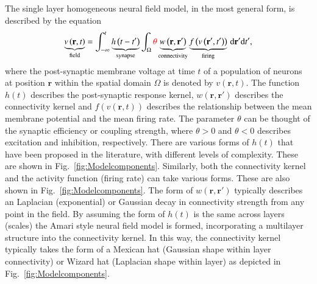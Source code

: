\documentclass[review,authoryear,3p]{elsarticle}
\newcommand{\parham}[1]{\textcolor{red}{#1}}
\begin{document}
\doublespacing

The single layer homogeneous neural field model, in the most general form, is described by the equation
\begin{equation}
	\label{FullDoubleIntModel} \underbrace{v\left(\mathbf{r},t\right)}_{\text{field}} =
	\int_{-\infty}^t 
	\underbrace{h\left(t - t'\right)}_{\text{synapse}} \int_\Omega
	\parham{\theta}\underbrace{w\left(\mathbf{r},\mathbf{r}'\right)}_{\text{connectivity}} 
	\underbrace{f\left( v\left( \mathbf{r}',t' \right)\right)}_{\text{firing}}
	\, \mathrm{d}\mathbf{r}'\mathrm{d}t',
\end{equation}
where the post-synaptic membrane voltage at time $t$ of a population of neurons at position $\mathbf r$ within the spatial domain $\Omega$ is denoted by $v\left(\mathbf r,t\right)$. The function $h(t)$ describes the post-synaptic response kernel, $w\left(\mathbf{r},\mathbf{r}'\right)$ describes the connectivity kernel and $f(v(\mathbf{r},t))$ describes the relationship between the mean membrane potential and the mean firing rate. The parameter $\theta$ can be thought of the synaptic efficiency or coupling strength, where $\theta>0$ and $\theta<0$ describes excitation and inhibition, respectively. There are various forms of $h(t)$ that have been proposed in the literature, with different levels of complexity. These are shown in Fig.~\ref{fig:Modelcomponents}. Similarly, both the connectivity kernel and the activity function (firing rate) can take various forms. These are also shown in Fig.~\ref{fig:Modelcomponents}. The form of $w(\mathbf{r},\mathbf{r}')$ typically describes an Laplacian (exponential) or Gaussian decay in connectivity strength from any point in the field. By assuming the form of $h(t)$ is the same across layers (scales) the Amari style neural field model is formed, incorporating a multilayer structure into the connectivity kernel. In this way, the connectivity kernel typically takes the form of a Mexican hat (Gaussian shape within layer connectivity) or Wizard hat (Laplacian shape within layer) as depicted in Fig.~\ref{fig:Modelcomponents}.
\end{document}
